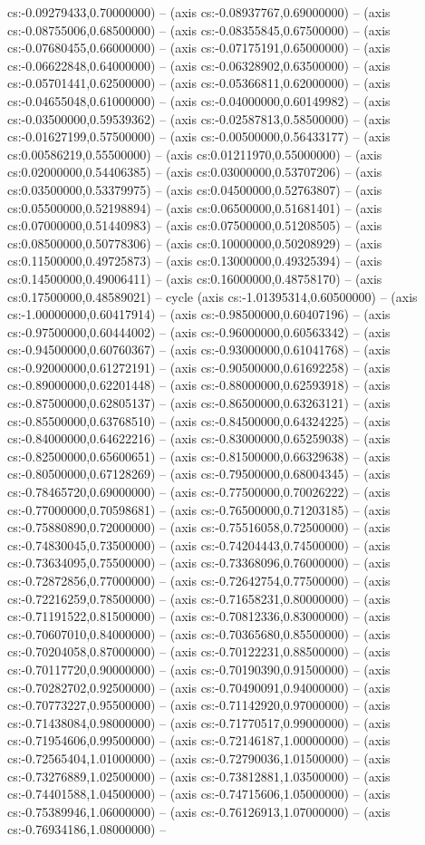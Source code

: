cs:-0.09279433,0.70000000) -- (axis cs:-0.08937767,0.69000000) -- (axis cs:-0.08755006,0.68500000) -- (axis cs:-0.08355845,0.67500000) -- (axis cs:-0.07680455,0.66000000) -- (axis cs:-0.07175191,0.65000000) -- (axis cs:-0.06622848,0.64000000) -- (axis cs:-0.06328902,0.63500000) -- (axis cs:-0.05701441,0.62500000) -- (axis cs:-0.05366811,0.62000000) -- (axis cs:-0.04655048,0.61000000) -- (axis cs:-0.04000000,0.60149982) -- (axis cs:-0.03500000,0.59539362) -- (axis cs:-0.02587813,0.58500000) -- (axis cs:-0.01627199,0.57500000) -- (axis cs:-0.00500000,0.56433177) -- (axis cs:0.00586219,0.55500000) -- (axis cs:0.01211970,0.55000000) -- (axis cs:0.02000000,0.54406385) -- (axis cs:0.03000000,0.53707206) -- (axis cs:0.03500000,0.53379975) -- (axis cs:0.04500000,0.52763807) -- (axis cs:0.05500000,0.52198894) -- (axis cs:0.06500000,0.51681401) -- (axis cs:0.07000000,0.51440983) -- (axis cs:0.07500000,0.51208505) -- (axis cs:0.08500000,0.50778306) -- (axis cs:0.10000000,0.50208929) -- (axis cs:0.11500000,0.49725873) -- (axis cs:0.13000000,0.49325394) -- (axis cs:0.14500000,0.49006411) -- (axis cs:0.16000000,0.48758170) -- (axis cs:0.17500000,0.48589021) -- cycle (axis cs:-1.01395314,0.60500000) -- (axis cs:-1.00000000,0.60417914) -- (axis cs:-0.98500000,0.60407196) -- (axis cs:-0.97500000,0.60444002) -- (axis cs:-0.96000000,0.60563342) -- (axis cs:-0.94500000,0.60760367) -- (axis cs:-0.93000000,0.61041768) -- (axis cs:-0.92000000,0.61272191) -- (axis cs:-0.90500000,0.61692258) -- (axis cs:-0.89000000,0.62201448) -- (axis cs:-0.88000000,0.62593918) -- (axis cs:-0.87500000,0.62805137) -- (axis cs:-0.86500000,0.63263121) -- (axis cs:-0.85500000,0.63768510) -- (axis cs:-0.84500000,0.64324225) -- (axis cs:-0.84000000,0.64622216) -- (axis cs:-0.83000000,0.65259038) -- (axis cs:-0.82500000,0.65600651) -- (axis cs:-0.81500000,0.66329638) -- (axis cs:-0.80500000,0.67128269) -- (axis cs:-0.79500000,0.68004345) -- (axis cs:-0.78465720,0.69000000) -- (axis cs:-0.77500000,0.70026222) -- (axis cs:-0.77000000,0.70598681) -- (axis cs:-0.76500000,0.71203185) -- (axis cs:-0.75880890,0.72000000) -- (axis cs:-0.75516058,0.72500000) -- (axis cs:-0.74830045,0.73500000) -- (axis cs:-0.74204443,0.74500000) -- (axis cs:-0.73634095,0.75500000) -- (axis cs:-0.73368096,0.76000000) -- (axis cs:-0.72872856,0.77000000) -- (axis cs:-0.72642754,0.77500000) -- (axis cs:-0.72216259,0.78500000) -- (axis cs:-0.71658231,0.80000000) -- (axis cs:-0.71191522,0.81500000) -- (axis cs:-0.70812336,0.83000000) -- (axis cs:-0.70607010,0.84000000) -- (axis cs:-0.70365680,0.85500000) -- (axis cs:-0.70204058,0.87000000) -- (axis cs:-0.70122231,0.88500000) -- (axis cs:-0.70117720,0.90000000) -- (axis cs:-0.70190390,0.91500000) -- (axis cs:-0.70282702,0.92500000) -- (axis cs:-0.70490091,0.94000000) -- (axis cs:-0.70773227,0.95500000) -- (axis cs:-0.71142920,0.97000000) -- (axis cs:-0.71438084,0.98000000) -- (axis cs:-0.71770517,0.99000000) -- (axis cs:-0.71954606,0.99500000) -- (axis cs:-0.72146187,1.00000000) -- (axis cs:-0.72565404,1.01000000) -- (axis cs:-0.72790036,1.01500000) -- (axis cs:-0.73276889,1.02500000) -- (axis cs:-0.73812881,1.03500000) -- (axis cs:-0.74401588,1.04500000) -- (axis cs:-0.74715606,1.05000000) -- (axis cs:-0.75389946,1.06000000) -- (axis cs:-0.76126913,1.07000000) -- (axis cs:-0.76934186,1.08000000) -- 